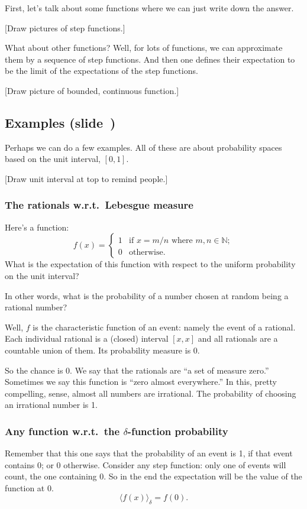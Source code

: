 \documentclass[11pt]{article}
\begin{document}
First, let's talk about some functions where we can just write down the answer. 

[Draw pictures of step functions.]

What about other functions? Well, for lots of functions, we can approximate
them by a sequence of step functions. And then one defines their expectation to
be the limit of the expectations of the step functions.

[Draw picture of bounded, continuous function.]

\newpage
\subsection*{Examples (slide~\pageref{slide:examples})}
Perhaps we can do a few examples. All of these are about probability spaces
based on the unit interval, $[0,1]$.

[Draw unit interval at top to remind people.]

\subsubsection*{The rationals w.r.t.\ Lebesgue measure}
Here's a function:
\[
f(x) = \begin{cases}
  1 & \text{if $x = m/n$ where $m,n\in\mathbb{N}$}; \\
  0 & \text{otherwise}.
\end{cases}
\]
What is the expectation of this function with respect to the uniform probability
on the unit interval?

In other words, what is the probability of a number chosen at random being a
rational number?

Well, $f$ is the characteristic function of an event: namely the event of a
rational. Each individual rational is a (closed) interval $[x,x]$ and all
rationals are a countable union of them. Its probability measure is 0.

So the chance is 0. We say that the rationals are ``a set of measure zero.''
Sometimes we say this function is ``zero almost everywhere.'' In this, pretty
compelling, sense, almost all numbers are irrational. The probability of
choosing an irrational number is 1.

\subsubsection*{Any function w.r.t.\ the $\delta$-function probability}

Remember that this one says that the probability of an event is 1, if that event
contains 0; or 0 otherwise. Consider any step function: only one of events will
count, the one containing 0. So in the end the expectation will be the value of
the function at 0.
\[
\langle f(x) \rangle_\delta = f(0).
\]
\end{document}
